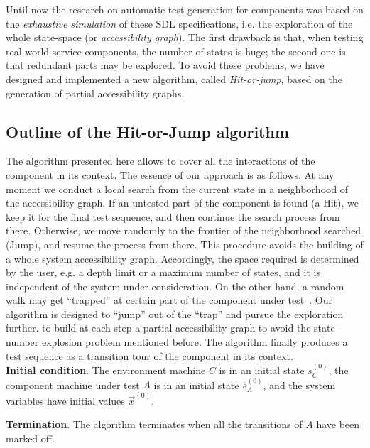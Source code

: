 Until now the research on automatic test generation for components was
based on the \emph{exhaustive simulation} of these SDL specifications,
i.e. the exploration of the whole state-space (or \emph{accessibility
graph}). The first drawback is that, when testing real-world service
components, the number of states is huge; the second one is that
redundant parts may be explored. To avoid these problems, we have
designed and implemented a new algorithm, called \emph{Hit-or-jump},
based on the generation of partial accessibility graphs.

\subsection{Outline of the Hit-or-Jump algorithm\label{hit}}

The algorithm presented here allows to cover all the interactions of
the component in its context. The essence of our approach is as
follows. At any moment we conduct a local search from the current
state in a neighborhood of the accessibility graph. If an untested
part of the component is found (a Hit), we keep it for the final test
sequence, and then continue the search process from there. Otherwise,
we move randomly to the frontier of the neighborhood searched (Jump),
and resume the process from there. This procedure avoids the
building of a whole system accessibility graph. Accordingly, the space
required is determined by the user, e.g. a depth limit or a maximum
number of states, and it is independent of the system under
consideration. On the other hand, a random walk may get ``trapped''
at certain part of the component under test~\cite{IEEE}.
Our algorithm is designed to ``jump'' out of the ``trap'' and
pursue the exploration further. to build at each step a
partial accessibility graph to avoid the state-number explosion
problem mentioned before. The algorithm finally produces a test
sequence as a transition tour of the component in its
context. \\

\noindent
{\bf Initial condition}. The environment machine $C$ is in an initial state
$s_C^{(0)}$, the component machine under test $A$ is in an initial
state $s_A^{(0)}$, and the system variables have initial values
$\vec{x}^{(0)}$.

\noindent
{\bf Termination}.
The algorithm terminates when all the transitions of $A$ have been
marked off.

